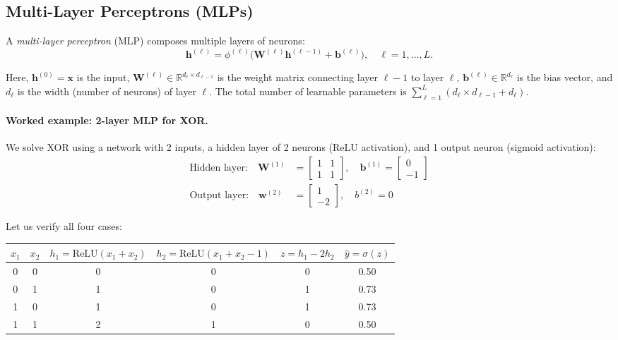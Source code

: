 \subsection{Multi-Layer Perceptrons (MLPs)}

A \emph{multi-layer perceptron} (MLP) composes multiple layers of neurons:
\begin{equation}
\mathbf{h}^{(\ell)} = \phi^{(\ell)}\bigl(\mathbf{W}^{(\ell)} \mathbf{h}^{(\ell-1)} + \mathbf{b}^{(\ell)}\bigr), \quad \ell = 1, \ldots, L.
\end{equation}

Here, $\mathbf{h}^{(0)} = \mathbf{x}$ is the input, $\mathbf{W}^{(\ell)} \in \mathbb{R}^{d_\ell \times d_{\ell-1}}$ is the weight matrix connecting layer $\ell-1$ to layer $\ell$, $\mathbf{b}^{(\ell)} \in \mathbb{R}^{d_\ell}$ is the bias vector, and $d_\ell$ is the width (number of neurons) of layer $\ell$. The total number of learnable parameters is $\sum_{\ell=1}^{L} (d_\ell \times d_{\ell-1} + d_\ell)$.

\paragraph{Worked example: 2-layer MLP for XOR.} We solve XOR using a network with 2 inputs, a hidden layer of 2 neurons (ReLU activation), and 1 output neuron (sigmoid activation):
\begin{align}
\text{Hidden layer:} \quad \mathbf{W}^{(1)} &= \begin{bmatrix} 1 & 1 \\ 1 & 1 \end{bmatrix}, \quad \mathbf{b}^{(1)} = \begin{bmatrix} 0 \\ -1 \end{bmatrix} \\
\text{Output layer:} \quad \mathbf{w}^{(2)} &= \begin{bmatrix} 1 \\ -2 \end{bmatrix}, \quad b^{(2)} = 0
\end{align}

Let us verify all four cases:
\begin{center}
\renewcommand{\arraystretch}{1.2}
\begin{tabular}{cc|cc|c|c}
\toprule
$x_1$ & $x_2$ & $h_1 = \text{ReLU}(x_1 + x_2)$ & $h_2 = \text{ReLU}(x_1 + x_2 - 1)$ & $z = h_1 - 2h_2$ & $\hat{y} = \sigma(z)$ \\
\midrule
0 & 0 & 0 & 0 & 0 & 0.50 \\
0 & 1 & 1 & 0 & 1 & 0.73 \\
1 & 0 & 1 & 0 & 1 & 0.73 \\
1 & 1 & 2 & 1 & 0 & 0.50 \\
\bottomrule
\end{tabular}
\end{center}

